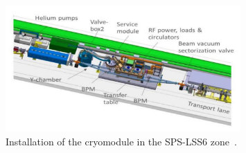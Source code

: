 \begin{figure}[h]
   \centering         
   \includegraphics[width=0.8\textwidth]{images/Ch4/CC_location_SPS_LSS6.png}
       \caption{Installation of the cryomodule in the SPS-LSS6 zone~\cite{Calaga:2649807}.}
       \label{fig:CC_SPS_LSS6}
\end{figure}

